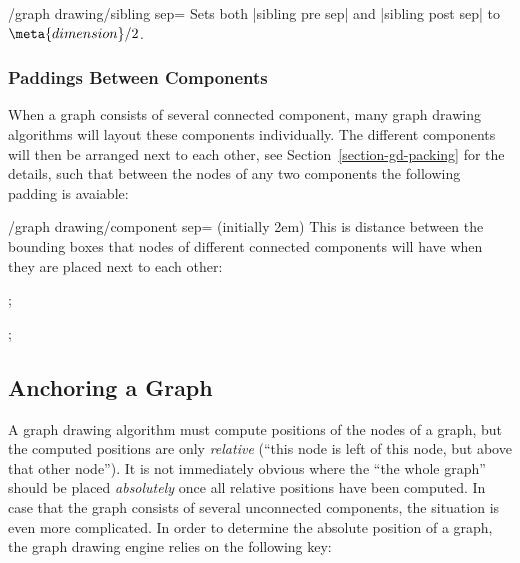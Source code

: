\begin{key}{/graph drawing/sibling sep=}
  Sets both |sibling pre sep| and |sibling post sep| to
  $\meta{dimension}/2$.
\end{key}




\subsubsection{Paddings Between Components}

When a graph consists of several connected component, many graph
drawing algorithms will layout these components individually. The
different components will then be arranged next to each other, see
Section~\ref{section-gd-packing} for the details, such that between
the nodes of any two components the following padding is avaiable:

\begin{key}{/graph drawing/component sep= (initially 2em)}
  This is distance between the bounding boxes that nodes of different
  connected components will have when they are placed next to each
  other:
\begin{codeexample}[]
\tikz {};  
\end{codeexample}
\begin{codeexample}[]
\tikz {};  
\end{codeexample}
\end{key}



\subsection{Anchoring a Graph}

\label{subsection-library-graphdrawing-anchoring}

A graph drawing algorithm must compute positions of the nodes of a
graph, but the computed positions are only \emph{relative} (``this
node is left of this node, but above that other node''). It is not
immediately obvious where the ``the whole graph'' should be placed
\emph{absolutely} once all relative positions have been computed. In
case that the graph consists of several unconnected components, the
situation is even more complicated.
In order to determine the absolute position of a graph, the graph
drawing engine relies on the following key:

